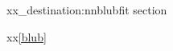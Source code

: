 \documentclass{article}
\begin{document}
\ExplSyntaxOn
xx\pdf_destination:nn{blub}{fit}
%
\ExplSyntaxOff
\ExplSyntaxOn\makeatletter
\ExplSyntaxOff\makeatother{}\label{blub}section\tagstructend
\ExplSyntaxOn
%
%
%
%
%
\ExplSyntaxOff

\lipsum

xx\ref{blub}
\end{document}
